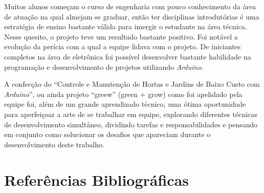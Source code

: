 \documentclass[a4paper,12pt]{article}
\begin{document}
Muitos alunos começam o curso de engenharia com pouco conhecimento da área de atuação na qual almejam se graduar, então ter disciplinas introdutórias é uma estratégia de ensino bastante válida para imergir o estudante na área técnica. Nesse quesito, o projeto teve um resultado bastante positivo. Foi notável a evolução da perícia com a qual a equipe lidava com o projeto. De iniciantes completos na área de eletrônica foi possível desenvolver bastante habilidade na programação e desenvolvimento de projetos utilizando \textit{Arduino}.

A confecção do ``Controle e Manutenção de Hortas e Jardins de Baixo Custo com \textit{Arduino}”, ou ainda projeto ``greew” (green + grow) como foi apelidado pela equipe foi, além de um grande aprendizado técnico, uma ótima oportunidade para aperfeiçoar a arte de se trabalhar em equipe, explorando diferentes técnicas de desenvolvimento simultâneo, dividindo tarefas e responsabilidades e pensando em conjunto como solucionar os desafios que apareciam durante o desenvolvimento deste trabalho.



%
\renewcommand\refname{}


\newpage
\section{Referências Bibliográficas}
\renewcommand\refname{}

%
%
\end{document}
